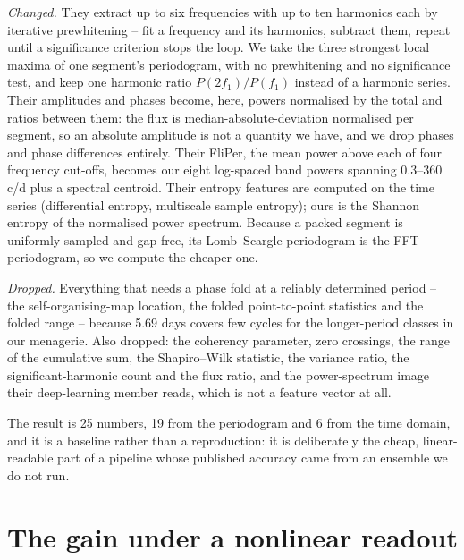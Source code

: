 \documentclass{article}
\begin{document}
\emph{Changed.} They extract up to six frequencies with up to ten harmonics each by iterative
prewhitening -- fit a frequency and its harmonics, subtract them, repeat until a significance
criterion stops the loop. We take the three strongest local maxima of one segment's periodogram, with
no prewhitening and no significance test, and keep one harmonic ratio $P(2f_{1})/P(f_{1})$ instead of
a harmonic series. Their amplitudes and phases become, here, powers normalised by the total and
ratios between them: the flux is median-absolute-deviation normalised per segment, so an absolute
amplitude is not a quantity we have, and we drop phases and phase differences entirely. Their
FliPer, the mean power above each of four frequency cut-offs, becomes our eight log-spaced band
powers spanning 0.3--360\,c/d plus a spectral centroid. Their entropy features are computed on the
time series (differential entropy, multiscale sample entropy); ours is the Shannon entropy of the
normalised power spectrum. Because a packed segment is uniformly sampled and gap-free, its
Lomb--Scargle periodogram is the FFT periodogram, so we compute the cheaper one.

\emph{Dropped.} Everything that needs a phase fold at a reliably determined period -- the
self-organising-map location, the folded point-to-point statistics and the folded range -- because
5.69 days covers few cycles for the longer-period classes in our menagerie. Also dropped: the
coherency parameter, zero crossings, the range of the cumulative sum, the Shapiro--Wilk statistic,
the variance ratio, the significant-harmonic count and the flux ratio, and the power-spectrum image
their deep-learning member reads, which is not a feature vector at all.

The result is 25 numbers, 19 from the periodogram and 6 from the time domain, and it is a baseline
rather than a reproduction: it is deliberately the cheap, linear-readable part of a pipeline whose
published accuracy came from an ensemble we do not run.

\section{The gain under a nonlinear readout}
\label{app:readout}
\end{document}
